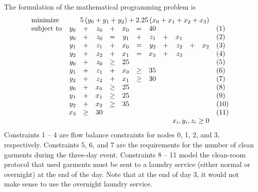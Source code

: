 \begin{enumerate}
\begin{solution}
\begin{center}
\end{center}

The formulation of the mathematical programming problem is
\[
\begin{array}{lrrrrrrrrrrll}
\textrm{minimize} & \multicolumn{11}{r}{5\left(y_0+y_1+y_2\right) + 2.25\left(x_0+x_1+x_2+x_3\right)}&\\
\textrm{subject to} & y_0&+&z_0&+&x_0&=&40&&&&&(1) \\
& y_0&+&z_0&=&y_1&+&z_1&+&x_1&&&(2) \\
& y_1&+&z_1&+&x_0&=&y_2&+&z_2&+&x_2&(3) \\
& y_2&+&z_2&+&x_1&=&x_3&+&z_3&&&(4)\\
& y_0&+&z_0&\geq&25&&&&&&&(5)\\
&y_1&+&z_1&+&x_0&\geq&35&&&&&(6)\\
&y_2&+&z_2&+&x_1&\geq&30&&&&&(7)\\
&y_0&+&x_0&\geq&25&&&&&&&(8)\\
&y_1&+&x_1&\geq&25&&&&&&&(9)\\
&y_2&+&x_2&\geq&35&&&&&&&(10)\\
&x_3&\geq&30&&&&&&&&&(11)\\
&\multicolumn{11}{r}{x_i,y_i,z_i \geq 0}&
\end{array}
\]
Constraints 1 -- 4 are flow balance constraints for nodes 0, 1, 2, and 3,
respectively. Constraints 5, 6, and 7 are the requirements for the number
of clean garments during the three-day event. Constraints 8 -- 11 model
the clean-room protocol that used garments must be sent to a laundry service
(either normal or overnight) at the end of the day. Note that at the end
of day 3, it would not make sense to use the overnight laundry service.


\end{solution}
\end{enumerate}
